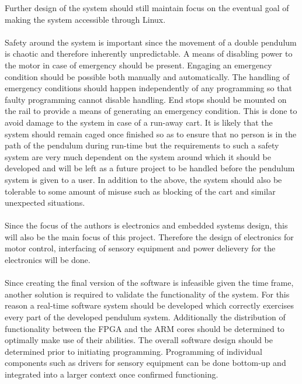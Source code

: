 Further design of the system should still maintain focus on the eventual goal of making the system accessible through Linux.
\\~\\
Safety around the system is important since the movement of a double pendulum is chaotic and therefore inherently unpredictable.
A means of disabling power to the motor in case of emergency should be present.  
Engaging an emergency condition should be possible both manually and automatically.
The handling of emergency conditions should happen independently of any programming so that faulty programming cannot disable handling.
End stops should be mounted on the rail to provide a means of generating an emergency condition.
This is done to avoid damage to the system in case of a run-away cart.
It is likely that the system should remain caged once finished so as to ensure that no person is in the path of the pendulum during run-time but the requirements to such a safety system are very much dependent on the system around which it should be developed and will be left as a future project to be handled before the pendulum system is given to a user.
In addition to the above, the system should also be tolerable to some amount of misuse such as blocking of the cart and similar unexpected situations.
\\~\\
Since the focus of the authors is electronics and embedded systems design, this will also be the main focus of this project.
Therefore the design of electronics for motor control, interfacing of sensory equipment and power delievery for the electronics will be done. 
\\~\\
Since creating the final version of the software is infeasible given the time frame, another solution is required to validate the functionality of the system.
For this reason a real-time software system should be developed which correctly exercises every part of the developed pendulum system.
Additionally the distribution of functionality between the FPGA and the ARM cores should be determined to optimally make use of their abilities.
The overall software design should be determined prior to initiating programming.
Programming of individual components such as drivers for sensory equipment can be done bottom-up and integrated into a larger context once confirmed functioning.

